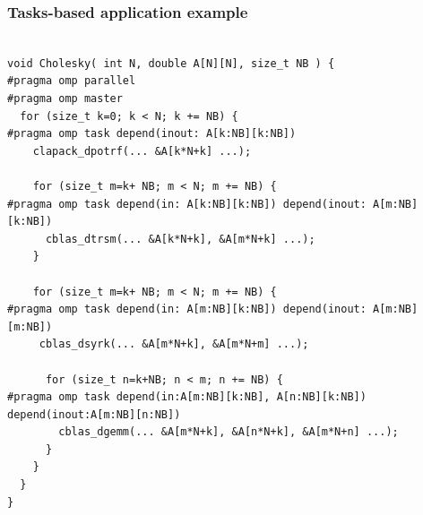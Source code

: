 \documentclass[xcolor={usenames,dvipsnames,svgnames,table}, aspectratio=43]{beamer}
\begin{document}
\begin{frame}[fragile]
\frametitle{Tasks-based application example}


    \begin{lstlisting}

void Cholesky( int N, double A[N][N], size_t NB ) {
#pragma omp parallel
#pragma omp master
  for (size_t k=0; k < N; k += NB) {
#pragma omp task depend(inout: A[k:NB][k:NB])
    clapack_dpotrf(... &A[k*N+k] ...);
                                                                  
    for (size_t m=k+ NB; m < N; m += NB) {
#pragma omp task depend(in: A[k:NB][k:NB]) depend(inout: A[m:NB][k:NB])
      cblas_dtrsm(... &A[k*N+k], &A[m*N+k] ...);
    }
     
    for (size_t m=k+ NB; m < N; m += NB) {
#pragma omp task depend(in: A[m:NB][k:NB]) depend(inout: A[m:NB][m:NB])
     cblas_dsyrk(... &A[m*N+k], &A[m*N+m] ...);

      for (size_t n=k+NB; n < m; n += NB) {
#pragma omp task depend(in:A[m:NB][k:NB], A[n:NB][k:NB]) depend(inout:A[m:NB][n:NB])
        cblas_dgemm(... &A[m*N+k], &A[n*N+k], &A[m*N+n] ...);
      }
    }
  }
}
\end{lstlisting}
\end{frame}



\end{document}
